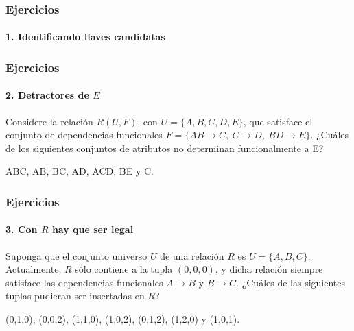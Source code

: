 \begin{frame}
    \frametitle{Ejercicios}
    \framesubtitle<2->{1. Identificando llaves candidatas}
    

\end{frame}

\begin{frame}
    \frametitle{Ejercicios}
    \framesubtitle{2. Detractores de $E$}

    Considere la relación $R(U, F)$, con $U=\{A,B,C,D,E\}$, que satisface el conjunto de
    dependencias funcionales $F = \{ AB \rightarrow C, \ C \rightarrow D, \ BD \rightarrow E \}$. ¿Cuáles de los siguientes
    conjuntos de atributos no determinan funcionalmente a E?

    \begin{center}
        ABC, AB, BC, AD, ACD, BE y C.
    \end{center}

\end{frame}

\begin{frame}
    \frametitle{Ejercicios}
    \framesubtitle{3. Con $R$ hay que ser legal}

    Suponga que el conjunto universo $U$ de una relación $R$ es $U = \{A,B,C\}$. Actualmente, $R$ s\'olo contiene a la tupla
    $(0,0,0)$, y dicha relación siempre satisface las dependencias funcionales $A \rightarrow B$ y $B \rightarrow C$. ¿Cuáles de las siguientes tuplas pudieran ser insertadas en $R$?
    \begin{center}
        (0,1,0), (0,0,2), (1,1,0), (1,0,2), (0,1,2), (1,2,0) y (1,0,1).
    \end{center}

\end{frame}

